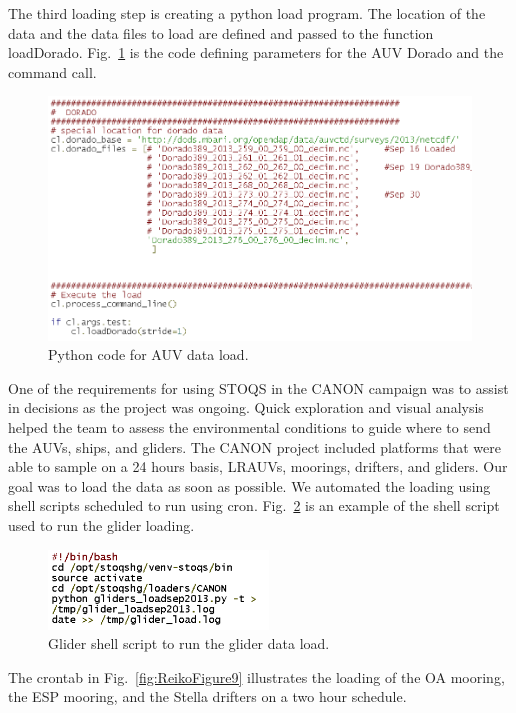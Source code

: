 The third loading step is creating a python load program.  The location of the data and the data files to load are defined and passed to the function loadDorado.  Fig.~\ref{fig:ReikoFigure7} is the code defining parameters for the AUV Dorado and the command call.

\begin{figure}[htbp]
\centering
\includegraphics[width=6.6in]{ReikoFigure7.png}
\caption{Python code for AUV data load.}
\label{fig:ReikoFigure7}
\end{figure}

One of the requirements for using STOQS in the CANON campaign was to assist in decisions as the project was ongoing. Quick exploration and visual analysis helped the team to assess the environmental conditions to guide where to send the AUVs, ships, and gliders.  The CANON project included platforms that were able to sample on a 24 hours basis, LRAUVs, moorings, drifters, and gliders.  Our goal was to load the data as soon as possible. We automated the loading using shell scripts scheduled to run using cron.  Fig.~\ref{fig:ReikoFigure8} is an example of the shell script used to run the glider loading.


\begin{figure}[htbp]
\centering
\includegraphics[width=2.3in]{ReikoFigure8.png}
\caption{Glider shell script to run the glider data load.}
\label{fig:ReikoFigure8}
\end{figure}

The crontab in Fig.~\ref{fig:ReikoFigure9} illustrates the loading of the OA mooring, the ESP mooring, and the Stella drifters on a two hour schedule.

